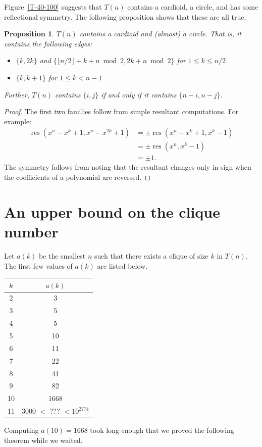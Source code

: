 \documentclass[]{article}
\newtheorem{proposition}{Proposition}[section]
\theoremstyle{definition}
\DeclareMathOperator{\res}{res}
\begin{document}
Figure~\ref{T-40-100} suggests that $T(n)$ contains a cardioid, a circle, and
has some reflectional symmetry. The following proposition shows that these are
all true.

\begin{proposition}
    $T(n)$ contains a cardioid and (almost) a circle. That is, it contains the
    following edges:
    \begin{itemize}
        \item $\{k, 2k\}$ and $\{\lfloor n / 2 \rfloor + k + n \bmod 2, 2k + n \bmod 2\}$ for $1 \leq k
            \leq n / 2$.
        \item $\{k, k + 1\}$ for $1 \leq k < n - 1$
    \end{itemize}
    Further, $T(n)$ contains $\{i, j\}$ if and only if it contains $\{n - i, n
    - j\}$.
\end{proposition}

\begin{proof}
    The first two families follow from simple resultant computations. For
    example:
    \begin{align*}
        \res(x^n - x^k + 1, x^n - x^{2k} + 1)
        &= \pm \res(x^n - x^k + 1, x^k - 1) \\
        &= \pm \res(x^n, x^k - 1) \\
        &= \pm 1.
    \end{align*}
    The symmetry follows from noting that the resultant changes only in sign when the
    coefficients of a polynomial are reversed.
\end{proof}

\section{An upper bound on the clique number}

Let $a(k)$ be the smallest $n$ such that there exists a clique of size $k$ in
$T(n)$. The first few values of $a(k)$ are listed below.

\begin{center}
    \begin{tabular}{c | c} $k$ & $a(k)$ \\
        \hline
        2 & 3 \\
        3 & 5 \\
        4 & 5 \\
        5 & 10 \\
        6 & 11 \\
        7 & 22 \\
        8 & 41 \\
        9 & 82 \\
        10 & 1668 \\
        11 & 3000 $<$ ??? $< 10^{2774}$
    \end{tabular}
\end{center}
Computing $a(10) = 1668$ took long enough that we proved the following theorem
while we waited.
\end{document}
